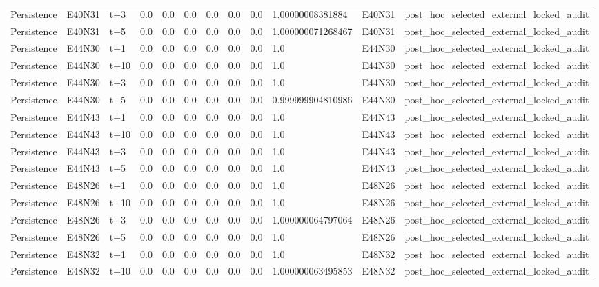 \begin{landscape}
\begin{longtable}{llllllllllll}
Persistence & E40N31 & t+3 & 0.0 & 0.0 & 0.0 & 0.0 & 0.0 & 0.0 & 1.00000008381884 & E40N31 & post\_hoc\_selected\_external\_locked\_audit \\
Persistence & E40N31 & t+5 & 0.0 & 0.0 & 0.0 & 0.0 & 0.0 & 0.0 & 1.000000071268467 & E40N31 & post\_hoc\_selected\_external\_locked\_audit \\
Persistence & E44N30 & t+1 & 0.0 & 0.0 & 0.0 & 0.0 & 0.0 & 0.0 & 1.0 & E44N30 & post\_hoc\_selected\_external\_locked\_audit \\
Persistence & E44N30 & t+10 & 0.0 & 0.0 & 0.0 & 0.0 & 0.0 & 0.0 & 1.0 & E44N30 & post\_hoc\_selected\_external\_locked\_audit \\
Persistence & E44N30 & t+3 & 0.0 & 0.0 & 0.0 & 0.0 & 0.0 & 0.0 & 1.0 & E44N30 & post\_hoc\_selected\_external\_locked\_audit \\
Persistence & E44N30 & t+5 & 0.0 & 0.0 & 0.0 & 0.0 & 0.0 & 0.0 & 0.999999904810986 & E44N30 & post\_hoc\_selected\_external\_locked\_audit \\
Persistence & E44N43 & t+1 & 0.0 & 0.0 & 0.0 & 0.0 & 0.0 & 0.0 & 1.0 & E44N43 & post\_hoc\_selected\_external\_locked\_audit \\
Persistence & E44N43 & t+10 & 0.0 & 0.0 & 0.0 & 0.0 & 0.0 & 0.0 & 1.0 & E44N43 & post\_hoc\_selected\_external\_locked\_audit \\
Persistence & E44N43 & t+3 & 0.0 & 0.0 & 0.0 & 0.0 & 0.0 & 0.0 & 1.0 & E44N43 & post\_hoc\_selected\_external\_locked\_audit \\
Persistence & E44N43 & t+5 & 0.0 & 0.0 & 0.0 & 0.0 & 0.0 & 0.0 & 1.0 & E44N43 & post\_hoc\_selected\_external\_locked\_audit \\
Persistence & E48N26 & t+1 & 0.0 & 0.0 & 0.0 & 0.0 & 0.0 & 0.0 & 1.0 & E48N26 & post\_hoc\_selected\_external\_locked\_audit \\
Persistence & E48N26 & t+10 & 0.0 & 0.0 & 0.0 & 0.0 & 0.0 & 0.0 & 1.0 & E48N26 & post\_hoc\_selected\_external\_locked\_audit \\
Persistence & E48N26 & t+3 & 0.0 & 0.0 & 0.0 & 0.0 & 0.0 & 0.0 & 1.000000064797064 & E48N26 & post\_hoc\_selected\_external\_locked\_audit \\
Persistence & E48N26 & t+5 & 0.0 & 0.0 & 0.0 & 0.0 & 0.0 & 0.0 & 1.0 & E48N26 & post\_hoc\_selected\_external\_locked\_audit \\
Persistence & E48N32 & t+1 & 0.0 & 0.0 & 0.0 & 0.0 & 0.0 & 0.0 & 1.0 & E48N32 & post\_hoc\_selected\_external\_locked\_audit \\
Persistence & E48N32 & t+10 & 0.0 & 0.0 & 0.0 & 0.0 & 0.0 & 0.0 & 1.000000063495853 & E48N32 & post\_hoc\_selected\_external\_locked\_audit \\

\end{longtable}
\end{landscape}
